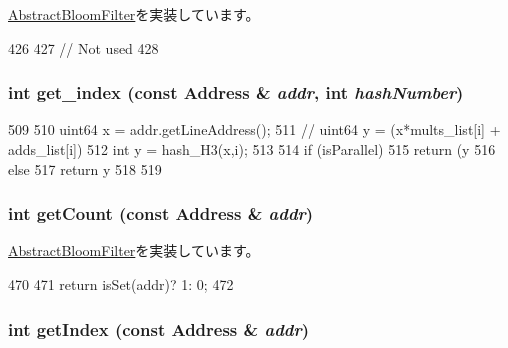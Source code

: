 \hyperlink{classAbstractBloomFilter_aa387151f4ab03c6cd497d4385e34c21a}{AbstractBloomFilter}を実装しています。


\begin{DoxyCode}
426 {
427     // Not used
428 }
\end{DoxyCode}
\hypertarget{classH3BloomFilter_a4e668c45847b52c4595b4c5c5f7fd8d0}{
\subsubsection[{get\_\-index}]{\setlength{\rightskip}{0pt plus 5cm}int get\_\-index (const {\bf Address} \& {\em addr}, \/  int {\em hashNumber})}}
\label{classH3BloomFilter_a4e668c45847b52c4595b4c5c5f7fd8d0}



\begin{DoxyCode}
509 {
510     uint64 x = addr.getLineAddress();
511     // uint64 y = (x*mults_list[i] + adds_list[i]) %
512     int y = hash_H3(x,i);
513 
514     if (isParallel) {
515         return (y %
516     } else {
517         return y %
518     }
519 }
\end{DoxyCode}
\hypertarget{classH3BloomFilter_abb722634d5846105b673e9496df8d062}{
\subsubsection[{getCount}]{\setlength{\rightskip}{0pt plus 5cm}int getCount (const {\bf Address} \& {\em addr})}}
\label{classH3BloomFilter_abb722634d5846105b673e9496df8d062}


\hyperlink{classAbstractBloomFilter_ab6253919ea6ff1b2c17506742b34147d}{AbstractBloomFilter}を実装しています。


\begin{DoxyCode}
470 {
471     return isSet(addr)? 1: 0;
472 }
\end{DoxyCode}
\hypertarget{classH3BloomFilter_a19f42f6f2fc3501021b768f0df8108b2}{
\subsubsection[{getIndex}]{\setlength{\rightskip}{0pt plus 5cm}int getIndex (const {\bf Address} \& {\em addr})}}
\label{classH3BloomFilter_a19f42f6f2fc3501021b768f0df8108b2}


